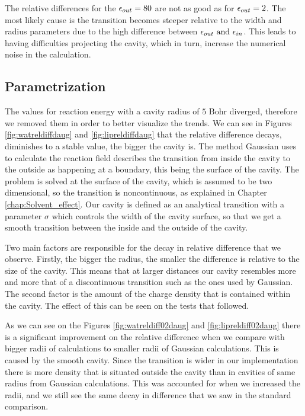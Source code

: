 \documentclass[../master_thesis.tex]{subfiles}
\begin{document}
The relative differences for the $\epsilon_{out} = 80$ are not as good as for $\epsilon_{out} = 2$.
The most likely cause is the transition becomes steeper relative
to the width and radius parameters due to the high difference between $\epsilon_{out} \text{ and } \epsilon_{in}$.
This leads to \mrchem having difficulties projecting the cavity, which in turn,
increase the numerical noise in the calculation.

\subsection{Parametrization }
The values for  reaction energy with a cavity radius of $5$ Bohr diverged, therefore
we removed them in order to better visualize the trends.
We can see in Figures \ref{fig:watreldiffdaug} and \ref{fig:lipreldiffdaug}
that the relative difference decays, diminishes to a stable value, the bigger the cavity is. The method Gaussian
uses to calculate the reaction field describes the transition from inside the
cavity to the outside as happening at a boundary, this being the surface of the cavity.
The problem is solved at the surface of the cavity, which is assumed to be two dimensional,
so the transition is noncontinuous, as explained in Chapter \ref{chap:Solvent_effect}.
Our cavity is defined as an analytical transition with a parameter $\sigma$ which
controls the width of the cavity surface, so that we get a smooth transition
between the inside and the outside of the cavity.

Two main factors are responsible for the decay in relative difference that we observe.
Firstly, the bigger the radius, the smaller the difference is relative to the
size of the cavity. This means that at larger distances our cavity resembles
more and more that of a discontinuous transition such as the ones used by
Gaussian. The second factor is the amount of the charge density that is contained within
the cavity. The effect of this can be seen on the tests that followed.

As we can see on the Figures \ref{fig:watreldiff02daug} and \ref{fig:lipreldiff02daug}
there is a significant improvement on the relative difference when we compare with
bigger radii of \mrchem calculations to smaller radii of Gaussian calculations.
This is caused by the smooth cavity. Since the transition is wider in our implementation
there is more density that is situated outside the cavity than in cavities of same radius
from Gaussian calculations. This was accounted for when we increased the radii, and we still
see the same decay in difference that we saw in the standard comparison.
\end{document}
